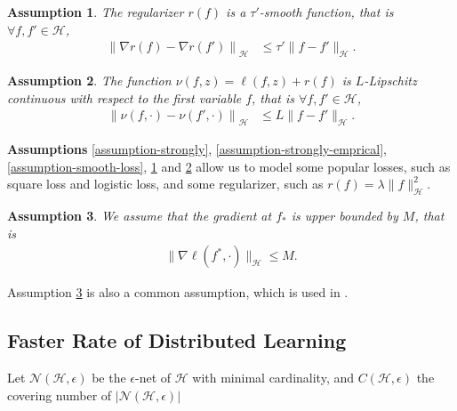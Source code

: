 \documentclass{article}
\newtheorem{assumption}{Assumption}
\begin{document}
\begin{assumption}
\label{assumption-smooth-r}
  The regularizer $r(f)$ is a $\tau'$-smooth function,
  that is $\forall f,f'\in\mathcal{H}$,
  \begin{align}
     \label{assumption-smooth-equaiton-loss}
     \left\|\nabla r(f)-\nabla r(f')\right\|_\mathcal{H}&\leq \tau'\|f-f'\|_\mathcal{H}.
  \end{align}
\end{assumption}

\begin{assumption}
\label{assumption-libs}
  The function $\nu(f,z)=\ell(f,z)+r(f)$ is $L$-Lipschitz continuous with respect to the first variable $f$,
  that is $\forall f,f'\in\mathcal{H}$,
  \begin{align}
     \label{assumption-libs-equation}
     \left\|\nu(f,\cdot)- \nu(f',\cdot)\right\|_\mathcal{H}&\leq L\|f-f'\|_\mathcal{H}.
  \end{align}
\end{assumption}

\textbf{Assumptions} \ref{assumption-strongly}, \ref{assumption-strongly-emprical}, \ref{assumption-smooth-loss}, \ref{assumption-smooth-r} and \ref{assumption-libs} allow us to model some popular losses,
such as square loss and logistic loss, and some regularizer, such as $r(f)=\lambda \|f\|_\mathcal{H}^2$.

\begin{assumption}
\label{assumption-optimal-bound}
  We assume that the gradient at $f_\ast$ is upper bounded by $M$, that is
  \begin{align*}
    \|\nabla \ell(f^\ast,\cdot)\|_\mathcal{H}\leq M.
  \end{align*}
\end{assumption}
Assumption \ref{assumption-optimal-bound} is also a common assumption, which is used in \cite{Zhang2017er,zhang2012communication}.
\subsection{Faster Rate of Distributed Learning}
Let $\mathcal{N}(\mathcal{H},\epsilon)$ be the $\epsilon$-net of $\mathcal{H}$ with minimal cardinality,
and $C(\mathcal{H},\epsilon)$ the covering number of $|\mathcal{N}(\mathcal{H},\epsilon)|$
\end{document}
